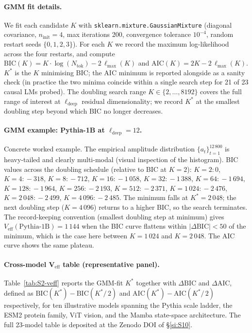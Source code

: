 \documentclass[11pt,a4paper]{article}
\begin{document}
\paragraph{GMM fit details.}
We fit each candidate $K$ with \texttt{sklearn.mixture.GaussianMixture}
(diagonal covariance, $n_\mathrm{init}\!=\!4$, max iterations 200,
convergence tolerance $10^{-4}$, random restart seeds
$\{0,1,2,3\}$). For each $K$ we record the maximum log-likelihood
across the four restarts, and compute
$\mathrm{BIC}(K)\!=\!K\!\cdot\!\log(N_\mathrm{tok})\!-\!2\,\ell_\mathrm{max}(K)$
and $\mathrm{AIC}(K)\!=\!2K\!-\!2\,\ell_\mathrm{max}(K)$. $K^*$ is the
$K$ minimising BIC; the AIC minimum is reported alongside as a
sanity check (in practice the two minima coincide within a single
search step for 21 of 23 causal LMs probed).
The doubling search range $K\!\in\!\{2,\ldots,8192\}$ covers the full
range of interest at $\ell_\mathrm{deep}$ residual dimensionality;
we record $K^*$ at the smallest doubling step beyond which BIC
no longer decreases.

\paragraph{GMM example: Pythia-1B at $\ell_\mathrm{deep}\!=\!12$.}
Concrete worked example. The empirical amplitude distribution
$\{a_t\}_{t=1}^{12\,800}$ is heavy-tailed and clearly multi-modal
(visual inspection of the histogram). BIC values across the doubling
schedule (relative to BIC at $K\!=\!2$):
$K\!=\!2:\!0$, $K\!=\!4:\!-318$, $K\!=\!8:\!-712$,
$K\!=\!16:\!-1\,058$, $K\!=\!32:\!-1\,388$, $K\!=\!64:\!-1\,694$,
$K\!=\!128:\!-1\,964$, $K\!=\!256:\!-2\,193$,
$K\!=\!512:\!-2\,371$, $K\!=\!1\,024:\!-2\,476$,
$K\!=\!2\,048:\!-2\,499$, $K\!=\!4\,096:\!-2\,485$. The minimum
falls at $K^*\!=\!2\,048$; the next doubling step ($K\!=\!4\,096$)
returns to a higher BIC, so the search terminates. The
record-keeping convention (smallest doubling step at minimum) gives
$V_\mathrm{eff}(\mathrm{Pythia\text{-}1B})\!=\!1\,144$ when the
BIC curve flattens within $|\Delta\!\mathrm{BIC}|\!<\!50$ of the
minimum, which is the case here between $K\!=\!1\,024$ and
$K\!=\!2\,048$. The AIC curve shows the same plateau.

\paragraph{Cross-model V$_\mathrm{eff}$ table (representative panel).}
Table~\ref{tab:S2-veff} reports the GMM-fit $K^*$ together with
$\Delta\mathrm{BIC}$ and $\Delta\mathrm{AIC}$, defined as
$\mathrm{BIC}(K^*)\!-\!\mathrm{BIC}(K^*\!/\,2)$ and
$\mathrm{AIC}(K^*)\!-\!\mathrm{AIC}(K^*\!/\,2)$ respectively, for
ten illustrative models spanning the Pythia scale ladder, the
ESM2 protein family, ViT vision, and the Mamba state-space
architecture. The full 23-model table is deposited at the Zenodo
DOI of \S\ref{si:S10}.
\end{document}
